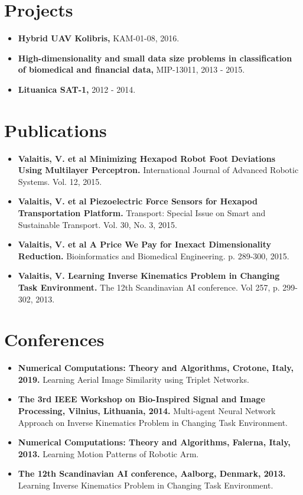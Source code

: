 \documentclass[letterpaper,11pt]{article}
\newcommand{\resumeItem}[2]{
  \item\small{
    \textbf{#1}{ #2 \vspace{-2pt}}
  }
}
\newcommand{\resumeSubItem}[2]{\resumeItem{#1}{#2}\vspace{-4pt}}
\newcommand{\resumeSubHeadingListStart}{\begin{itemize}[leftmargin=*] \renewcommand\labelitemi{$\circ$}}
\newcommand{\resumeSubHeadingListEnd}{\end{itemize}}
\begin{document}
\section{Projects}
  \resumeSubHeadingListStart
    \resumeSubItem{Hybrid UAV Kolibris,}{KAM-01-08, 2016.}
    \resumeSubItem{High-dimensionality and small data size problems in classification of biomedical and financial data,}{MIP-13011, 2013 - 2015.}
    \resumeSubItem{Lituanica SAT-1,}{2012 - 2014.}
  \resumeSubHeadingListEnd

\section{Publications}
    \resumeSubHeadingListStart
    \resumeSubItem{Valaitis, V. et al Minimizing Hexapod Robot Foot Deviations Using Multilayer Perceptron.}{International Journal of Advanced Robotic Systems. Vol. 12, 2015.}
    \resumeSubItem{Valaitis, V. et al Piezoelectric Force Sensors for Hexapod Transportation Platform.}{Transport: Special Issue on Smart and Sustainable Transport. Vol. 30, No. 3, 2015.}
    \resumeSubItem{Valaitis, V. et al A Price We Pay for Inexact Dimensionality Reduction.}{Bioinformatics and Biomedical Engineering. p. 289-300, 2015.}
    \resumeSubItem{Valaitis, V. Learning Inverse Kinematics Problem in Changing Task Environment.}{The 12th Scandinavian AI conference. Vol 257, p. 299-302, 2013.}
  \resumeSubHeadingListEnd

\section{Conferences}
  \resumeSubHeadingListStart
    \resumeSubItem{Numerical Computations: Theory and Algorithms, Crotone, Italy, 2019.}{Learning Aerial Image Similarity using Triplet Networks.}
    \resumeSubItem{The 3rd IEEE Workshop  on Bio-Inspired Signal and Image Processing, Vilnius, Lithuania, 2014.}{Multi-agent Neural Network Approach on Inverse Kinematics Problem in Changing Task Environment.}
    \resumeSubItem{Numerical Computations: Theory and Algorithms, Falerna, Italy, 2013.}{Learning Motion Patterns of Robotic Arm.}
    \resumeSubItem{The 12th Scandinavian AI conference, Aalborg, Denmark, 2013.}{Learning Inverse Kinematics Problem in Changing Task Environment.}
  \resumeSubHeadingListEnd
\end{document}
